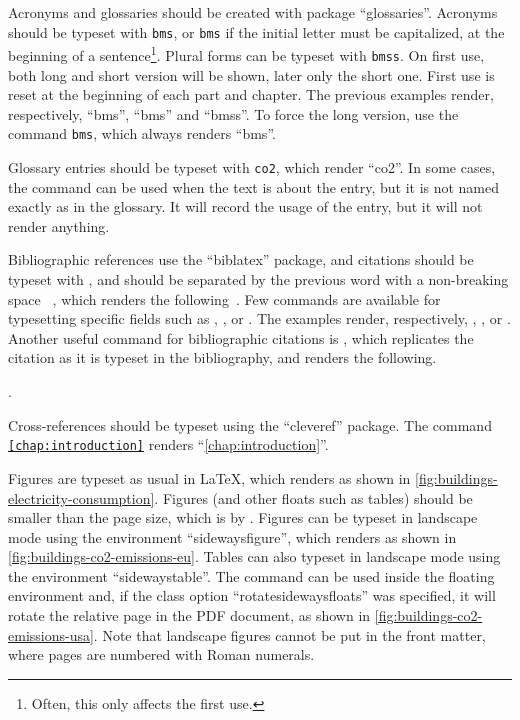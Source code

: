 Acronyms and glossaries should be created with package \enquote{glossaries}.
Acronyms should be typeset with \texttt{\ac{bms}}, or \texttt{\Ac{bms}} if the initial letter must be capitalized, \eg at the beginning of a sentence\footnote{Often, this only affects the first use.}.
Plural forms can be typeset with \texttt{\acp{bms}}.
On first use, both long and short version will be shown, later only the short one.
First use is reset at the beginning of each part and chapter.
The previous examples render, respectively, \enquote{\ac{bms}}, \enquote{\Ac{bms}} and \enquote{\acp{bms}}.
To force the long version, use the command \texttt{\acl{bms}}, which always renders \enquote{\acl{bms}}.

Glossary entries should be typeset with \texttt{\gls{co2}}, which render \enquote{\gls{co2}}.
In some cases, the command \texttt{} can be used when the text is about the entry, but it is not named exactly as in the glossary.
It will record the usage of the entry, but it will not render anything.

Bibliographic references use the \enquote{biblatex} package, and citations should be typeset with \texttt{\autocite{eu:32018L0844}}, and should be separated by the previous word with a non-breaking space \texttt{~}, which renders the following~\autocite{eu:32018L0844}.
Few commands are available for typesetting specific fields such as \texttt{}, \texttt{\citeauthor{eu:32018L0844}}, \texttt{\citeyear{eu:32018L0844}} or \texttt{}.
The examples render, respectively, , \citeauthor{eu:32018L0844}, \citeyear{eu:32018L0844} or .
Another useful command for bibliographic citations is \texttt{}, which replicates the citation as it is typeset in the bibliography, and renders the following.

.

Cross-references should be typeset using the \enquote{cleveref} package.
The command \texttt{\cref{chap:introduction}} renders \enquote{\cref{chap:introduction}}.

Figures are typeset as usual in \LaTeX, which renders as shown in \cref{fig:buildings-electricity-consumption}.
Figures (and other floats such as tables) should be smaller than the page size, which is \printlength{\textwidth} by \printlength{\textheight}.
Figures can be typeset in landscape mode using the environment \enquote{sidewaysfigure}, which renders as shown in \cref{fig:buildings-co2-emissions-eu}.
Tables can also typeset in landscape mode using the environment \enquote{sidewaystable}.
The command \texttt{\rotatesidewayslabel} can be used inside the floating environment and, if the class option \enquote{rotatesidewaysfloats} was specified, it will rotate the relative page in the PDF document, as shown in \cref{fig:buildings-co2-emissions-usa}.
Note that landscape figures cannot be put in the front matter, \ie where pages are numbered with Roman numerals.

